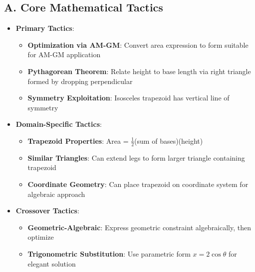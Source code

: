 \documentclass[12pt]{article}
\begin{document}
\begin{tacticalbox}
\subsection*{A. Core Mathematical Tactics}
\begin{itemize}[leftmargin=*]
    \item \textbf{Primary Tactics}: 
    \begin{itemize}
        \item \textbf{Optimization via AM-GM}: Convert area expression to form suitable for AM-GM application
        \item \textbf{Pythagorean Theorem}: Relate height to base length via right triangle formed by dropping perpendicular
        \item \textbf{Symmetry Exploitation}: Isosceles trapezoid has vertical line of symmetry
    \end{itemize}
    \item \textbf{Domain-Specific Tactics}: 
    \begin{itemize}
        \item \textbf{Trapezoid Properties}: Area = $\frac{1}{2}$(sum of bases)(height)
        \item \textbf{Similar Triangles}: Can extend legs to form larger triangle containing trapezoid
        \item \textbf{Coordinate Geometry}: Can place trapezoid on coordinate system for algebraic approach
    \end{itemize}
    \item \textbf{Crossover Tactics}: 
    \begin{itemize}
        \item \textbf{Geometric-Algebraic}: Express geometric constraint algebraically, then optimize
        \item \textbf{Trigonometric Substitution}: Use parametric form $x = 2\cos\theta$ for elegant solution
    \end{itemize}
\end{itemize}
\end{tacticalbox}
\end{document}
